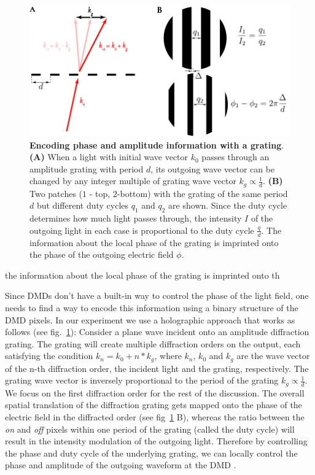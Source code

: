 \begin{figure}[t]
	\centering
	\includegraphics[scale=1]{figures/DMD_grating.pdf}
	\caption{{\bf Encoding phase and amplitude information with a grating}. {\bf (A)} When a light with initial wave vector $k_0$ passes through an amplitude grating with period $d$, its outgoing wave vector can be changed by any integer multiple of grating wave vector $k_g\propto \frac{1}{d}$. {\bf (B)} Two patches ($1$ - top, $2$-bottom) with the grating of the same period $d$ but different duty cycles $q_1$ and $q_2$ are shown. Since the duty cycle determines how much light passes through, the intensity $I$ of the outgoing light in each case is proportional to the duty cycle $\frac{q}{d}$. The information about the local phase of the grating is imprinted onto the phase of the outgoing electric field $\phi$.}
	\label{fig:DMD_grating}
\end{figure}

the information about the local phase of the grating is imprinted onto th

Since DMDs don't have a built-in way to control the phase of the light field, one needs to find a way to encode this information using a binary structure of the DMD pixels. In our experiment we use a holographic approach that works as follows (see fig.~\ref{fig:DMD_grating}): Consider a plane wave incident onto an amplitude diffraction grating. The grating will create multiple diffraction orders on the output, each satisfying the condition $k_n = k_0 + n*k_g$, where $k_n$, $k_0$ and $k_g$ are the wave vector of the n-th diffraction order, the incident light and the grating, respectively. The grating wave vector is inversely proportional to the period of the grating $k_g \propto \frac{1}{d}$. We focus on the first diffraction order for the rest of the discussion. The overall spatial translation of the diffraction grating gets mapped onto the phase of the electric field in the diffracted order (see fig~\ref{fig:DMD_grating} B), whereas the ratio between the \textit{on} and \textit{off} pixels within one period of the grating (called the duty cycle) will result in the intensity modulation of the outgoing light. Therefore by controlling the phase and duty cycle of the underlying grating, we can locally control the phase and amplitude of the outgoing waveform at the DMD \cite{Zupanchich thesis}.

